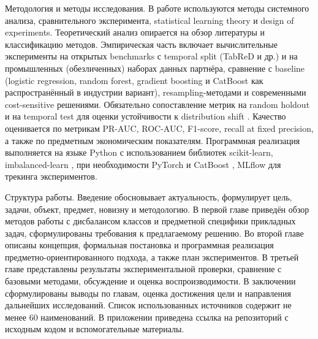 Методология и методы исследования. В работе используются методы системного анализа, сравнительного эксперимента, statistical learning theory и design of experiments. Теоретический анализ опирается на обзор литературы и классификацию методов. Эмпирическая часть включает вычислительные эксперименты на открытых benchmarks с temporal split (TabReD и др.) и на промышленных (обезличенных) наборах данных партнёра, сравнение с baseline (logistic regression, random forest, gradient boosting и CatBoost как распространённый в индустрии вариант), resampling-методами и современными cost-sensitive решениями. Обязательно сопоставление метрик на random holdout и на temporal test для оценки устойчивости к distribution shift \cite{rubachev2025tabred}. Качество оценивается по метрикам PR-AUC, ROC-AUC, F1-score, recall at fixed precision, а также по предметным экономическим показателям. Программная реализация выполняется на языке Python с использованием библиотек scikit-learn, imbalanced-learn \cite{lemaitre2017imbalanced,imblearnGitHub2026,imblearnDocs2026}, при необходимости PyTorch и CatBoost \cite{prokhorenkova2018catboost}, MLflow для трекинга экспериментов.

Структура работы. Введение обосновывает актуальность, формулирует цель, задачи, объект, предмет, новизну и методологию. В первой главе приведён обзор методов работы с дисбалансом классов и предметной специфики прикладных задач, сформулированы требования к предлагаемому решению. Во второй главе описаны концепция, формальная постановка и программная реализация предметно-ориентированного подхода, а также план экспериментов. В третьей главе представлены результаты экспериментальной проверки, сравнение с базовыми методами, обсуждение и оценка воспроизводимости. В заключении сформулированы выводы по главам, оценка достижения цели и направления дальнейших исследований. Список использованных источников содержит не менее 60 наименований. В приложении приведена ссылка на репозиторий с исходным кодом и вспомогательные материалы.
